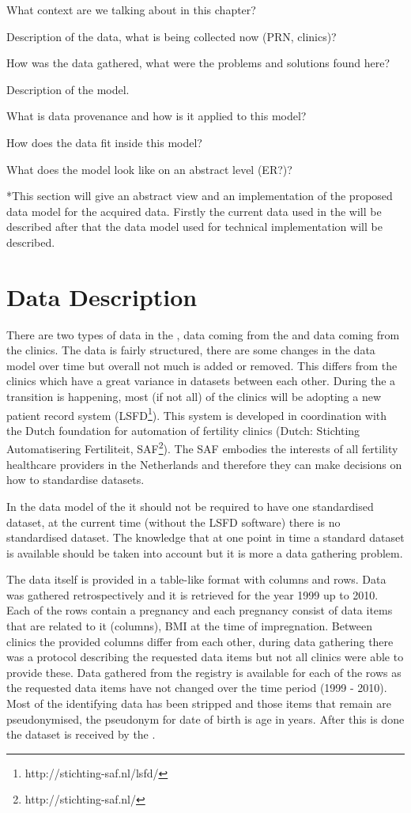 
What context are we talking about in this chapter?

Description of the data, what is being collected now (PRN, clinics)?

How was the data gathered, what were the problems and solutions found here?

Description of the model.

What is data provenance and how is it applied to this model?

How does the data fit inside this model?

What does the model look like on an abstract level (ER?)?


\/*This section will give an abstract view and an implementation of the proposed data model for the acquired data.
Firstly the current data used in the \project{} will be described after that the data model used for technical implementation will be described.

\section{Data Description}
\label{datamodel-data-description}

There are two types of data in the \project{}, data coming from the \PRN{} and data coming from the clinics.
The \PRN{} data is fairly structured, there are some changes in the data model over time but overall not much is added or removed.
This differs from the clinics which have a great variance in datasets between each other.
During the \project{} a transition is happening, most (if not all) of the clinics will be adopting a new patient record system (LSFD\footnote{http://stichting-saf.nl/lsfd/}).
This system is developed in coordination with the Dutch foundation for automation of fertility clinics (Dutch: Stichting Automatisering Fertiliteit, SAF\footnote{http://stichting-saf.nl/}).
The SAF embodies the interests of all fertility healthcare providers in the Netherlands and therefore they can make decisions on how to standardise datasets.

In the data model of the \ivfsystem{} it should not be required to have one standardised dataset, at the current time (without the LSFD software) there is no standardised dataset.
The knowledge that at one point in time a standard dataset is available should be taken into account but it is more a data gathering problem.

The data itself is provided in a table-like format with columns and rows.
Data was gathered retrospectively and it is retrieved for the year 1999 up to 2010.
Each of the rows contain a pregnancy and each pregnancy consist of data items that are related to it (columns), \eg{} BMI at the time of impregnation.
Between clinics the provided columns differ from each other, during data gathering there was a protocol describing the requested data items but not all clinics were able to provide these.
Data gathered from the \PRN{} registry is available for each of the rows as the requested data items have not changed over the time period (1999 - 2010).
Most of the identifying data has been stripped and those items that remain are pseudonymised, \eg{} the pseudonym for date of birth is age in years.
After this is done the dataset is received by the \ivfsystem{}.

